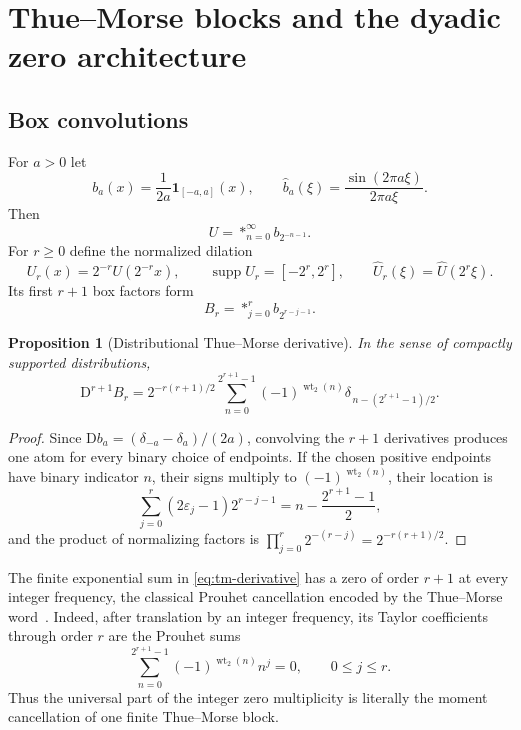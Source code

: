 \documentclass[11pt,oneside]{article}
\newtheorem{proposition}[theorem]{Proposition}
\theoremstyle{definition}
\theoremstyle{remark}
\newcommand{\wt}{\operatorname{wt}_2}
\newcommand{\supp}{\operatorname{supp}}
\newcommand{\D}{\mathrm D}
\begin{document}
\section{Thue--Morse blocks and the dyadic zero architecture}
\label{sec:zero-architecture}

\subsection{Box convolutions}
For $a>0$ let
\begin{equation}
 b_a(x)=\frac1{2a}\mathbf1_{[-a,a]}(x),
 \qquad \widehat b_a(\xi)=\frac{\sin(2\pi a\xi)}{2\pi a\xi}.
 \label{eq:box}
\end{equation}
Then
\begin{equation}
 U=*_{n=0}^{\infty}b_{2^{-n-1}}.
 \label{eq:up-box-convolution}
\end{equation}
For $r\ge0$ define the normalized dilation
\begin{equation}
 U_r(x)=2^{-r}U(2^{-r}x),
 \qquad \supp U_r=[-2^r,2^r],
 \qquad \widehat U_r(\xi)=\widehat U(2^r\xi).
 \label{eq:Ur}
\end{equation}
Its first $r+1$ box factors form
\begin{equation}
 B_r=*_{j=0}^{r}b_{2^{r-j-1}}.
 \label{eq:Br}
\end{equation}

\begin{proposition}[Distributional Thue--Morse derivative]
\label{prop:tm-derivative}
In the sense of compactly supported distributions,
\begin{equation}
 \D^{r+1}B_r
 =2^{-r(r+1)/2}
 \sum_{n=0}^{2^{r+1}-1}
 (-1)^{\wt(n)}
 \delta_{\,n-(2^{r+1}-1)/2}.
 \label{eq:tm-derivative}
\end{equation}
\end{proposition}

\begin{proof}
Since
$\D b_a=(\delta_{-a}-\delta_a)/(2a)$, convolving the $r+1$ derivatives produces one atom for every binary choice of endpoints.  If the chosen positive endpoints have binary indicator $n$, their signs multiply to $(-1)^{\wt(n)}$, their location is
\[
 \sum_{j=0}^{r}(2\varepsilon_j-1)2^{r-j-1}
 =n-\frac{2^{r+1}-1}{2},
\]
and the product of normalizing factors is
$\prod_{j=0}^{r}2^{-(r-j)}=2^{-r(r+1)/2}$.
\end{proof}

The finite exponential sum in \eqref{eq:tm-derivative} has a zero of order $r+1$ at every integer frequency, the classical Prouhet cancellation encoded by the Thue--Morse word~\cite{prouhet,alloucheShallit}.  Indeed, after translation by an integer frequency, its Taylor coefficients through order $r$ are the Prouhet sums
\begin{equation}
 \sum_{n=0}^{2^{r+1}-1}(-1)^{\wt(n)}n^j=0,
 \qquad 0\le j\le r.
 \label{eq:prouhet}
\end{equation}
Thus the universal part of the integer zero multiplicity is literally the moment cancellation of one finite Thue--Morse block.
\end{document}
